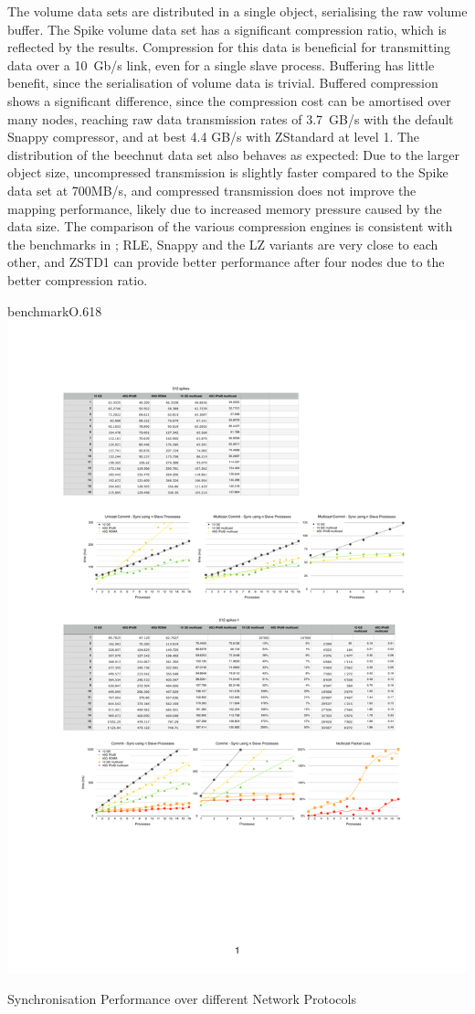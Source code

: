 The volume data sets are distributed in a single object, serialising the raw
volume buffer. The Spike volume data set has a significant compression ratio,
which is reflected by the results. Compression for this data is beneficial for
transmitting data over a 10~Gb/s link, even for a single slave process.
Buffering has little benefit, since the serialisation of volume data is trivial.
Buffered compression shows a significant difference, since the compression cost
can be amortised over many nodes, reaching raw data transmission rates of 3.7~GB/s with the default Snappy compressor, and at best 4.4 GB/s with ZStandard at
level 1. The distribution of the beechnut data set also behaves as expected:
Due to the larger object size, uncompressed transmission is slightly faster
compared to the Spike data set at 700MB/s, and compressed transmission does not
improve the mapping performance, likely due to increased memory pressure caused
by the data size. The comparison of the various compression engines is
consistent with the benchmarks in ; RLE, Snappy and the
LZ variants are very close to each other, and ZSTD1 can provide better
performance after four nodes due to the better compression ratio.

\begin{wrapfloat}{benchmark}{O}{.618\textwidth}
  \includegraphics[width=.618\textwidth]{results/network}
  {\caption{\label{rNetwork}Synchronisation Performance over different Network Protocols}}
\end{wrapfloat}

